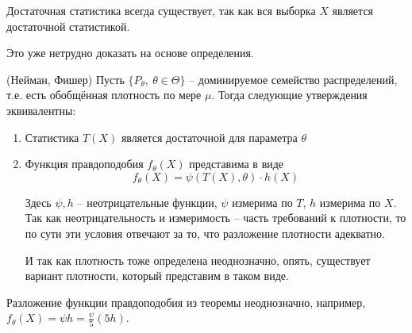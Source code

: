 \begin{note}
    Достаточная статистика всегда существует, так как вся выборка $X$ является достаточной статистикой.

    Это уже нетрудно доказать на основе определения.
\end{note}

\begin{theorem} (Нейман, Фишер)
    Пусть $\{P_\theta,\ \theta \in \Theta\}$ -- доминируемое семейство распределений, т.е. есть обобщённая плотность по мере $\mu$. Тогда следующие утверждения эквивалентны:
    \begin{enumerate}
        \item Статистика $T(X)$ является достаточной для параметра $\theta$
        \item Функция правдоподобия $f_\theta(X)$ представима в виде
        \[
            f_\theta(X) = \psi(T(X), \theta) \cdot h(X)
        \]
        
        Здесь $\psi, h$ -- неотрицательные функции, $\psi$ измерима по $T$, $h$ измерима по $X$. Так как неотрицательность и измеримость -- часть требований к плотности, то по сути эти условия отвечают за то, что разложение плотности адекватно.

        И так как плотность тоже определена неоднозначно, опять, существует вариант плотности, который представим в таком виде.
    \end{enumerate}
\end{theorem}

\begin{note}
    Разложение функции правдоподобия из теоремы неоднозначно, например, $f_\theta(X) = \psi h = \frac{\psi}{5} (5h)$.
\end{note}

